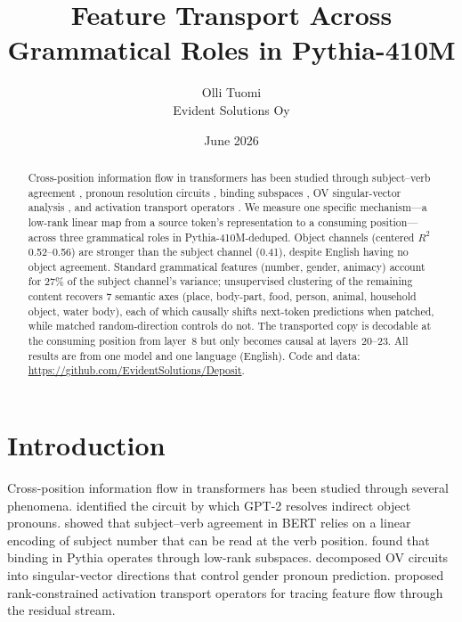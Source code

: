 \documentclass[11pt,a4paper]{article}
\title{\textbf{Feature Transport Across Grammatical Roles in Pythia-410M}}
\author{Olli Tuomi\\Evident Solutions Oy}
\date{June 2026}
\begin{document}
\maketitle

\begin{abstract}
\noindent
Cross-position information flow in transformers has been studied through subject--verb
agreement \citep{hao2023verb}, pronoun resolution circuits \citep{wang2022interpretability},
binding subspaces \citep{feng2023language}, OV singular-vector analysis
\citep{ahmad2025beyond}, and activation transport operators \citep{szablewski2025activation}.
We measure one specific mechanism---a low-rank linear map from a source token's
representation to a consuming position---across three grammatical roles in Pythia-410M-deduped.
Object channels (centered $R^2$ 0.52--0.56) are stronger than the subject channel (0.41),
despite English having no object agreement. Standard grammatical features (number, gender,
animacy) account for 27\% of the subject channel's variance; unsupervised clustering of the
remaining content recovers 7 semantic axes (place, body-part, food, person, animal, household
object, water body), each of which causally shifts next-token predictions when patched, while
matched random-direction controls do not. The transported copy is decodable at the consuming
position from layer~8 but only becomes causal at layers~20--23. All results are from one
model and one language (English).
Code and data: \url{https://github.com/EvidentSolutions/Deposit}.
\end{abstract}

\section{Introduction}
\label{sec:intro}

Cross-position information flow in transformers has been studied through several phenomena.
\citet{wang2022interpretability} identified the circuit by which GPT-2 resolves indirect
object pronouns. \citet{hao2023verb} showed that subject--verb agreement in BERT relies on a
linear encoding of subject number that can be read at the verb position.
\citet{feng2023language} found that binding in Pythia operates through low-rank subspaces.
\citet{ahmad2025beyond} decomposed OV circuits into singular-vector directions that control
gender pronoun prediction. \citet{szablewski2025activation} proposed rank-constrained
activation transport operators for tracing feature flow through the residual stream.
\end{document}
